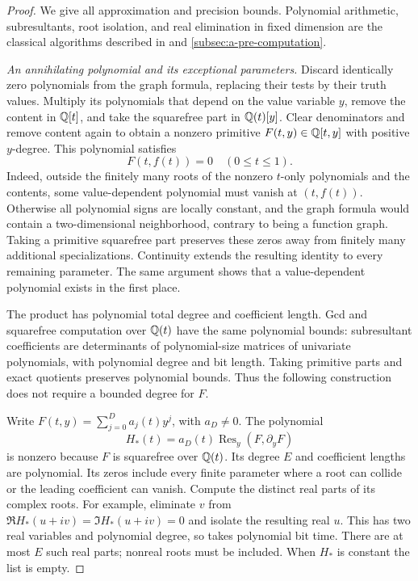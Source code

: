 \begin{proof}
We give all approximation and precision bounds. Polynomial arithmetic,
subresultants, root isolation, and real elimination in fixed dimension
are the classical algorithms described in
\citet{basu2006-algorithms-in-real-algebraic-geometry} and
\cref{subsec:a-pre-computation}.

\emph{An annihilating polynomial and its exceptional parameters.}
Discard identically zero polynomials from the graph formula, replacing
their tests by their truth values. Multiply its polynomials that depend
on the value variable $y$, remove the content in $\mathbb{Q}[t]$, and take the
squarefree part in $\mathbb{Q}(t)[y]$. Clear denominators and remove content
again to obtain a nonzero primitive $F(t,y)\in\mathbb{Q}[t,y]$ with positive
$y$-degree. This polynomial satisfies
\begin{equation}
 F(t,f(t))=0\quad(0\le t\le1).
 \label{eq:a-wblk-annihilator}
\end{equation}
Indeed, outside the finitely many roots of the nonzero $t$-only
polynomials and the contents, some value-dependent polynomial must
vanish at $(t,f(t))$. Otherwise all polynomial signs are locally constant,
and the graph formula would contain a two-dimensional neighborhood,
contrary to being a function graph. Taking a primitive squarefree part
preserves these zeros away from finitely many additional specializations.
Continuity extends the resulting identity to every remaining parameter.
The same argument shows that a value-dependent polynomial exists in the
first place.

The product has polynomial total degree and coefficient length. Gcd and
squarefree computation over $\mathbb{Q}(t)$ have the same polynomial bounds:
subresultant coefficients are determinants of polynomial-size matrices
of univariate polynomials, with polynomial degree and bit length. Taking
primitive parts and exact quotients preserves polynomial bounds. Thus
the following construction does not require a bounded degree for $F$.

Write $F(t,y)=\sum_{j=0}^D a_j(t)y^j$, with $a_D\ne0$. The polynomial
\[
 H_*(t)=a_D(t)\operatorname{Res}_y(F,\partial_yF)
\]
is nonzero because $F$ is squarefree over $\mathbb{Q}(t)$. Its degree $E$ and
coefficient lengths are polynomial. Its zeros include every finite
parameter where a root can collide or the leading coefficient can vanish.
Compute the distinct real parts of its complex roots. For example,
eliminate $v$ from
$\Re H_*(u+iv)=\Im H_*(u+iv)=0$ and isolate the resulting real $u$.
This has two real variables and polynomial degree, so takes polynomial
bit time. There are at most $E$ such real parts; nonreal roots must be
included. When $H_*$ is constant the list is empty.


\end{proof}
